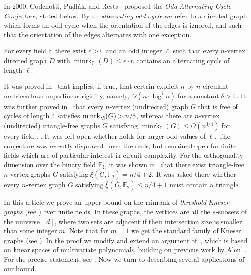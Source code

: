 \documentclass{toc}
\newcommand{\Fset}{\mathbb{F}}
\newcommand{\od}{\overline{\xi}}
\newcommand{\eps}{\epsilon}
\newcommand{\minrank}{\mathop{\mathrm{minrk}}}
\begin{document}
In 2000, Codenotti, Pudl{\'{a}}k, and Resta~\cite{CodenottiPR00} proposed the
\emph{Odd Alternating Cycle Conjecture}, stated below.
By an \emph{alternating odd cycle} we refer to a directed graph which forms an odd cycle when the orientation of the edges is ignored, and such that the orientation of the edges alternates with one exception.
\begin{conjecture}\label{conj:alternating}
For every field $\Fset$ there exist $\eps >0$ and an odd integer $\ell$ such that every $n$-vertex directed graph $D$ with ${\minrank}_{\Fset} (D)  \leq \eps \cdot n$ contains an alternating cycle of length $\ell$.
\end{conjecture}

It was proved in~\cite{CodenottiPR00} that  implies, if true, that certain explicit $n$ by $n$ circulant matrices have superlinear rigidity,
%
namely, $\Omega( n \cdot \log^\delta n)$ for a constant $\delta>0$.
%
%
%
%
%
%
%
It was further proved in~\cite{CodenottiPR00} that every $n$-vertex (undirected) graph $G$ that is free of cycles of length $4$ satisfies ${\minrank}_{\R}(G) > n/6$, whereas
%
there are $n$-vertex (undirected) triangle-free graphs $G$ satisfying ${\minrank}_{\Fset}(G) \leq O(n^{3/4})$ for every field $\Fset$.
%
It was left open whether
%
holds  %
for larger
%
odd
values of $\ell$.
%
%
The conjecture was recently disproved~\cite{Haviv18free} over the reals, %
but remained open for finite fields which are of %
particular %
interest in circuit complexity.
For the orthogonality dimension over the binary field $\Fset_2$, it was shown in~\cite{CodenottiPR00} that there exist triangle-free $n$-vertex graphs $G$ satisfying $\od(\overline{G},\Fset_2) = n/4+2$. It was asked there whether every $n$-vertex graph $G$ satisfying $\od(\overline{G},\Fset_2) \leq n/4+1$ must contain a triangle.

In this article
we prove %
an upper bound %
on the minrank
%
%
of \emph{threshold Kneser graphs}  %
(see )  %
over finite fields.  %
In these graphs, the vertices are all the $s$-subsets of %
the  %
universe $[d]$, where two sets are adjacent if their intersection size is smaller than some integer $m$. Note that for $m=1$ we get the standard family of Kneser graphs (see ).
In the proof we modify and extend an argument of~\cite{Haviv18free}, which is based on linear spaces of multivariate polynomials, building on
%
previous work by  %
Alon~\cite{AlonUnion98}. For the precise statement, see .  %
Now we  %
turn to %
describing %
several applications of our bound.
\end{document}
